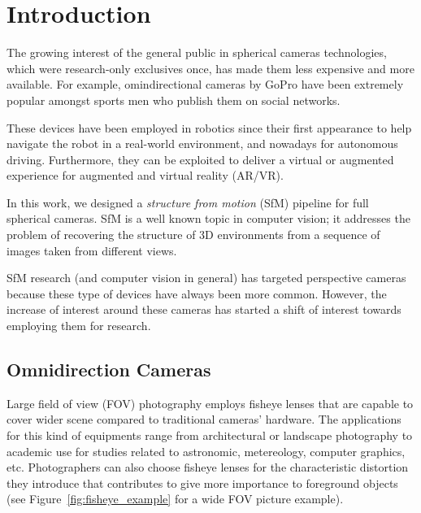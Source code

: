 \chapter{Introduction}
The growing interest of the general public in spherical cameras technologies, which were 
research-only exclusives once, has made them less expensive and more available. For example, omindirectional cameras by GoPro have been extremely popular amongst sports men who publish them on social networks.

These devices have been employed in robotics since their first appearance to help navigate the robot in a real-world environment, and nowadays for autonomous driving. Furthermore, they can be exploited to deliver a virtual or augmented experience for augmented and virtual reality (AR/VR).

In this work, we designed a \textit{structure from motion} (SfM) pipeline for 
full spherical cameras. SfM is a well known topic in computer vision; it addresses the problem of 
recovering the structure of 3D environments from a sequence of images taken from different views.

SfM research (and computer vision in general) has targeted perspective cameras because these type of devices have always been more common. However, the increase of interest around these cameras has started a shift of interest towards employing them for research.

\section{Omnidirection Cameras}
Large field of view (FOV) photography employs fisheye lenses that are capable to cover 
wider scene compared to traditional cameras' hardware.
The applications for this kind of equipments range from architectural or 
landscape photography to academic use for studies related to astronomic, 
metereology, computer graphics, etc.
Photographers can also choose fisheye lenses for the characteristic distortion
they introduce that contributes to give more importance to foreground objects
(see Figure~\ref{fig:fisheye_example} for a wide FOV picture example).

